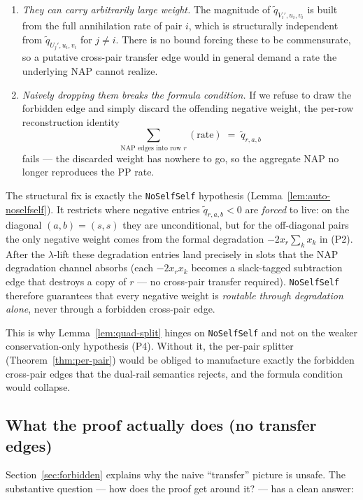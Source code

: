\documentclass[11pt]{article}
\begin{document}
\begin{enumerate}
  \item \emph{They can carry arbitrarily large weight.} The magnitude
    of $\widetilde q_{V_i', u_i, v_i}$ is built from the full
    annihilation rate of pair $i$, which is structurally independent
    from $\widetilde q_{U_j', u_i, v_i}$ for $j \ne i$. There is no
    bound forcing these to be commensurate, so a putative cross-pair
    transfer edge would in general demand a rate the underlying NAP
    cannot realize.

  \item \emph{Naively dropping them breaks the formula condition.} If
    we refuse to draw the forbidden edge and simply discard the
    offending negative weight, the per-row reconstruction identity
    \[
       \sum_{\text{NAP edges into row } r}(\text{rate})
       \;=\; \widetilde q_{r, a, b}
    \]
    fails — the discarded weight has nowhere to go, so the aggregate
    NAP no longer reproduces the PP rate.
\end{enumerate}

The structural fix is exactly the \verb|NoSelfSelf| hypothesis
(Lemma~\ref{lem:auto-noselfself}). It restricts where negative entries
$\widetilde q_{r, a, b} < 0$ are \emph{forced} to live: on the
diagonal $(a, b) = (s, s)$ they are unconditional, but for the
off-diagonal pairs the only negative weight comes from the formal
degradation $-2 x_r \sum_k x_k$ in (P2). After the $\lambda$-lift these
degradation entries land precisely in slots that the NAP degradation
channel absorbs (each $-2 x_r x_k$ becomes a slack-tagged subtraction
edge that destroys a copy of $r$ — no cross-pair transfer required).
\verb|NoSelfSelf| therefore guarantees that every negative weight is
\emph{routable through degradation alone}, never through a forbidden
cross-pair edge.

This is why Lemma~\ref{lem:quad-split} hinges on \verb|NoSelfSelf| and
not on the weaker conservation-only hypothesis (P4). Without it, the
per-pair splitter (Theorem~\ref{thm:per-pair}) would be obliged to
manufacture exactly the forbidden cross-pair edges that the dual-rail
semantics rejects, and the formula condition would collapse.

\subsection{What the proof actually does (no transfer edges)}
\label{sec:mechanism}

Section~\ref{sec:forbidden} explains why the naive ``transfer'' picture
is unsafe. The substantive question — how does the proof get around it?
— has a clean answer:
\end{document}
